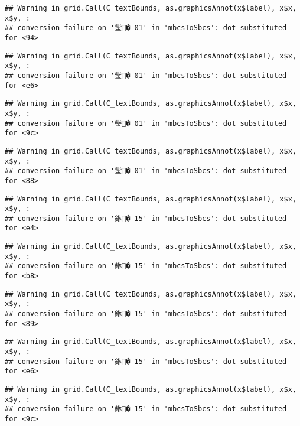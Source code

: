 \documentclass[]{article}
\begin{document}
\begin{verbatim}
## Warning in grid.Call(C_textBounds, as.graphicsAnnot(x$label), x$x, x$y, :
## conversion failure on '鈭� 01' in 'mbcsToSbcs': dot substituted for <94>
\end{verbatim}

\begin{verbatim}
## Warning in grid.Call(C_textBounds, as.graphicsAnnot(x$label), x$x, x$y, :
## conversion failure on '鈭� 01' in 'mbcsToSbcs': dot substituted for <e6>
\end{verbatim}

\begin{verbatim}
## Warning in grid.Call(C_textBounds, as.graphicsAnnot(x$label), x$x, x$y, :
## conversion failure on '鈭� 01' in 'mbcsToSbcs': dot substituted for <9c>
\end{verbatim}

\begin{verbatim}
## Warning in grid.Call(C_textBounds, as.graphicsAnnot(x$label), x$x, x$y, :
## conversion failure on '鈭� 01' in 'mbcsToSbcs': dot substituted for <88>
\end{verbatim}

\begin{verbatim}
## Warning in grid.Call(C_textBounds, as.graphicsAnnot(x$label), x$x, x$y, :
## conversion failure on '銝� 15' in 'mbcsToSbcs': dot substituted for <e4>
\end{verbatim}

\begin{verbatim}
## Warning in grid.Call(C_textBounds, as.graphicsAnnot(x$label), x$x, x$y, :
## conversion failure on '銝� 15' in 'mbcsToSbcs': dot substituted for <b8>
\end{verbatim}

\begin{verbatim}
## Warning in grid.Call(C_textBounds, as.graphicsAnnot(x$label), x$x, x$y, :
## conversion failure on '銝� 15' in 'mbcsToSbcs': dot substituted for <89>
\end{verbatim}

\begin{verbatim}
## Warning in grid.Call(C_textBounds, as.graphicsAnnot(x$label), x$x, x$y, :
## conversion failure on '銝� 15' in 'mbcsToSbcs': dot substituted for <e6>
\end{verbatim}

\begin{verbatim}
## Warning in grid.Call(C_textBounds, as.graphicsAnnot(x$label), x$x, x$y, :
## conversion failure on '銝� 15' in 'mbcsToSbcs': dot substituted for <9c>
\end{verbatim}
\end{document}
